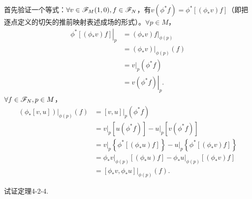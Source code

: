 \begin{xiti}
	\begin{zm}
		首先验证一个等式：$\forall v \in \mathscr{F}_M(1,0),f\in \mathscr{F}_N $，有$v(\phi^* f)=\phi^*\left[ (\phi_* v)f \right] $（即把逐点定义的切矢的推前映射表述成场的形式）。$\forall p \in M $，
		\begin{align*}
		\left. \phi^*\left[ (\phi_* v)f \right] \right|_p &= \left. (\phi_* v)f \right|_{\phi(p)} \\
		&= \left. (\phi_* v) \right|_{\phi(p)}(f)\\
		&= \left. v \right|_p \left( \phi^* f \right)\\
		&= \left. v \left( \phi^* f \right) \right|_p.
		\end{align*}
		$\forall f\in \mathscr{F}_N,p\in M $，
		\begin{align*}
		\left. \left(\phi_*\left[v,u\right]\right) \right|_{\phi(p)} (f) &= \left. \left[v,u\right] \right|_p \left(\phi^* f \right)\\
		&= \left. v\right|_p [u(\phi^* f)]- \left. u \right|_p [v(\phi^* f)]\\
		&= \left. v \right|_p \left\{ \phi^* \left[ \left( \phi_* u \right) f \right] \right\} - \left. u \right|_p \left\{ \phi^* \left[ \left( \phi_* v \right) f \right] \right\}\\
		&= \left. \phi_* v \right|_{\phi(p)} \left[ \left( \phi_* u \right) f \right] - \left. \phi_* u \right|_{\phi(p)} \left[ \left( \phi_* v \right) f \right]\\
		&= \left. \left[\phi_* v,\phi_* u\right] \right|_{\phi(p)} (f).
		\end{align*}
	\end{zm}

	\item 试证定理4-2-4.


\end{xiti}
